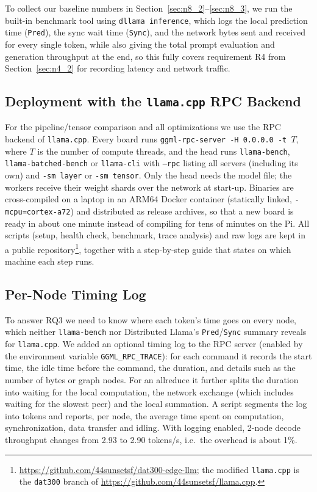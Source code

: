 \documentclass[11pt,a4paper]{article}
\begin{document}
To collect our baseline numbers in Section~\ref{sec:n8_2}--\ref{sec:n8_3}, we run the built-in benchmark tool using \texttt{dllama inference}, which logs the local prediction time (\texttt{Pred}), the sync wait time (\texttt{Sync}), and the network bytes sent and received for every single token, while also giving the total prompt evaluation and generation throughput at the end, so this fully covers requirement R4 from Section~\ref{sec:n4_2} for recording latency and network traffic.

\subsection{Deployment with the \texttt{llama.cpp} RPC Backend}\label{sec:n7_6}

For the pipeline/tensor comparison and all optimizations we use the RPC backend of \texttt{llama.cpp}. Every board runs \texttt{ggml-rpc-server -H 0.0.0.0 -t $T$}, where $T$ is the number of compute threads, and the head runs \texttt{llama-bench}, \texttt{llama-batched-bench} or \texttt{llama-cli} with \texttt{--rpc} listing all servers (including its own) and \texttt{-sm layer} or \texttt{-sm tensor}. Only the head needs the model file; the workers receive their weight shards over the network at start-up. Binaries are cross-compiled on a laptop in an ARM64 Docker container (statically linked, \texttt{-mcpu=cortex-a72}) and distributed as release archives, so that a new board is ready in about one minute instead of compiling for tens of minutes on the Pi. All scripts (setup, health check, benchmark, trace analysis) and raw logs are kept in a public repository\footnote{\url{https://github.com/44sunsetsf/dat300-edge-llm}; the modified \texttt{llama.cpp} is the \texttt{dat300} branch of \url{https://github.com/44sunsetsf/llama.cpp}.}, together with a step-by-step guide that states on which machine each step runs.

\subsection{Per-Node Timing Log}\label{sec:trace}

To answer RQ3 we need to know where each token's time goes on every node, which neither \texttt{llama-bench} nor Distributed Llama's \texttt{Pred}/\texttt{Sync} summary reveals for \texttt{llama.cpp}. We added an optional timing log to the RPC server (enabled by the environment variable \texttt{GGML\_RPC\_TRACE}): for each command it records the start time, the idle time before the command, the duration, and details such as the number of bytes or graph nodes. For an allreduce it further splits the duration into waiting for the local computation, the network exchange (which includes waiting for the slowest peer) and the local summation. A script segments the log into tokens and reports, per node, the average time spent on computation, synchronization, data transfer and idling. With logging enabled, 2-node decode throughput changes from 2.93 to 2.90 tokens/s, i.e.\ the overhead is about 1\%.
\end{document}
